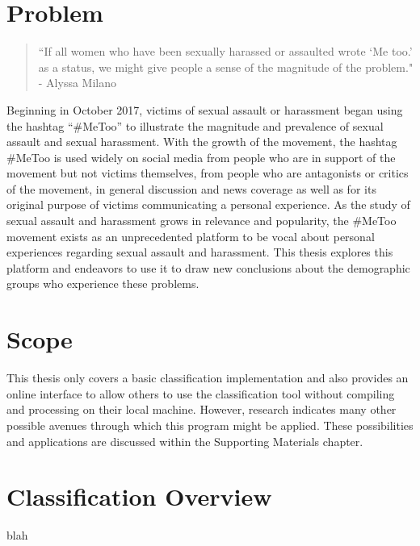 \section{Problem}

\begin{quote}
``If all women who have been sexually harassed or assaulted wrote `Me too.' as a status, we might give people a sense of the magnitude of the problem." - Alyssa Milano
\end{quote}

Beginning in October 2017, victims of sexual assault or harassment began using the hashtag “\#MeToo” to illustrate the magnitude and prevalence of sexual assault and sexual harassment. With the growth of the movement, the hashtag \#MeToo is used widely on social media from people who are in support of the movement but not victims themselves, from people who are antagonists or critics of the movement, in general discussion and news coverage as well as for its original purpose of victims communicating a personal experience. As the study of sexual assault and harassment grows in relevance and popularity, the \#MeToo movement exists as an unprecedented platform to be vocal about personal experiences regarding sexual assault and harassment. This thesis explores this platform and endeavors to use it to draw new conclusions about the demographic groups who experience these problems.

\section{Scope}

This thesis only covers a basic classification implementation and also provides an online interface to allow others to use the classification tool without compiling and processing on their local machine. However, research indicates many other possible avenues through which this program might be applied. These possibilities and applications are discussed within the Supporting Materials chapter.

\section{Classification Overview}

blah
